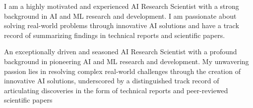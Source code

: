   I am a highly motivated and experienced AI Research Scientist with a strong background in AI and ML research and development. I am passionate about solving real-world problems through innovative AI solutions and have a track record of summarizing findings in technical reports and scientific papers.

An exceptionally driven and seasoned AI Research Scientist with a profound background in pioneering AI and ML research and development. My unwavering passion lies in resolving complex real-world challenges through the creation of innovative AI solutions, underscored by a distinguished track record of articulating discoveries in the form of technical reports and peer-reviewed scientific papers
